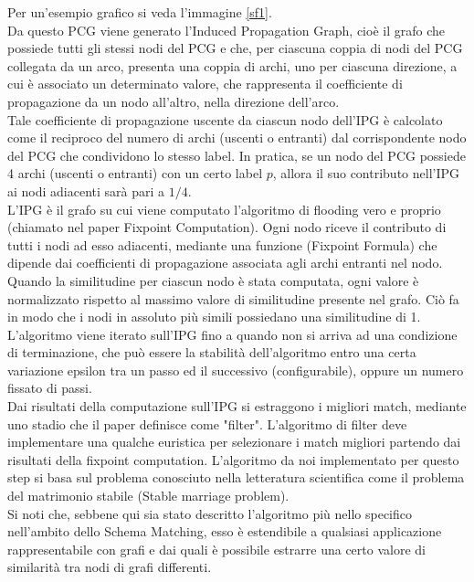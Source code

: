 \documentclass[a4paper,10pt]{article}
\begin{document}
Per un'esempio grafico si veda l'immagine \ref{sf1}.\\

Da questo PCG viene generato l'Induced Propagation Graph, cioè il grafo che possiede tutti gli stessi nodi del PCG e che, per ciascuna coppia di nodi del PCG collegata da un arco, presenta una coppia di archi, uno per ciascuna direzione, a cui è associato un determinato valore, che rappresenta il coefficiente di propagazione da un nodo all'altro, nella direzione dell'arco.\\

Tale coefficiente di propagazione uscente da ciascun nodo dell'IPG è calcolato come il reciproco del numero di archi (uscenti o entranti) dal corrispondente nodo del PCG che condividono lo stesso label. In pratica, se un nodo del PCG possiede 4 archi (uscenti o entranti) con un certo label $p$, allora il suo contributo nell'IPG ai nodi adiacenti sarà pari a $1/4$.\\

L’IPG è il grafo su cui viene computato l’algoritmo di flooding vero e proprio (chiamato nel paper Fixpoint Computation). Ogni nodo riceve il contributo di tutti i nodi ad esso adiacenti, mediante una funzione (Fixpoint Formula) che dipende dai coefficienti di propagazione associata agli archi entranti nel nodo. Quando la similitudine per ciascun nodo è stata computata, ogni valore è normalizzato rispetto al massimo valore di similitudine presente nel grafo. Ciò fa in modo che i nodi in assoluto più simili possiedano una similitudine di 1.\\

L’algoritmo viene iterato sull’IPG fino a quando non si arriva ad una condizione di terminazione, che può essere la stabilità dell’algoritmo entro una certa variazione epsilon tra un passo ed il successivo (configurabile), oppure un numero fissato di passi.\\

Dai risultati della computazione sull’IPG si estraggono i migliori match, mediante uno stadio che il paper definisce come "filter". L'algoritmo di filter deve implementare una qualche euristica per selezionare i match migliori partendo dai risultati della fixpoint computation. L'algoritmo da noi implementato per questo step si basa sul problema conosciuto nella letteratura scientifica come il problema del matrimonio stabile (Stable marriage problem).\\

Si noti che, sebbene qui sia stato descritto l'algoritmo più nello specifico nell'ambito dello Schema Matching, esso è estendibile a qualsiasi applicazione rappresentabile con grafi e dai quali è possibile estrarre una certo valore di similarità tra nodi di grafi differenti. \\
\end{document}
